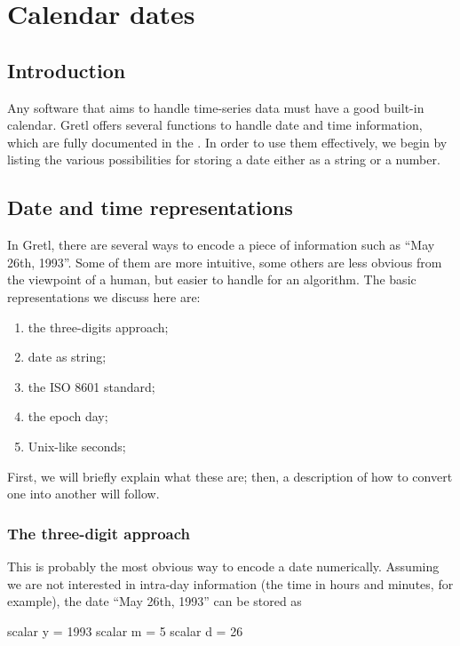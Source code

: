 \chapter{Calendar dates}
\label{chap:calendar}

\section{Introduction}
\label{sec:cal-intro}

Any software that aims to handle time-series data must have a good
built-in calendar. Gretl offers several functions to handle date and
time information, which are fully documented in the \GCR{}. In order
to use them effectively, we begin by listing the various possibilities
for storing a date either as a string or a number.

\section{Date and time representations}
\label{sec:cal-representations}

In Gretl, there are several ways to encode a piece of information such
as ``May 26th, 1993''. Some of them are more intuitive, some others
are less obvious from the viewpoint of a human, but easier to handle
for an algorithm. The basic representations we discuss here are:
\begin{enumerate}
\item the three-digits approach;
\item date as string;
\item the ISO 8601 standard;
\item the epoch day;
\item Unix-like seconds;
\end{enumerate}
First, we will briefly explain what these are; then, a description of
how to convert one into another will follow.

\subsection{The three-digit approach}
\label{sec:cal-3digits}

This is probably the most obvious way to encode a date
numerically. Assuming we are not interested in intra-day information
(the time in hours and minutes, for example), the date ``May 26th,
1993'' can be stored as
\begin{code}
  scalar y = 1993
  scalar m = 5
  scalar d = 26
\end{code}

